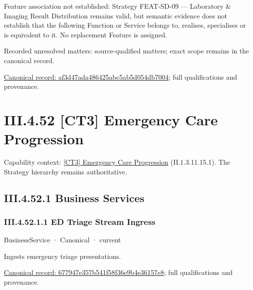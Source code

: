Feature association not established: Strategy FEAT-SD-09 — Laboratory \& Imaging Result Distribution remains valid, but semantic evidence does not establish that the following Function or Service belongs to, realises, specialises or is equivalent to it. No replacement Feature is assigned.


{\small Recorded unresolved matters: source-qualified matters; exact scope remains in the canonical record.}\par
{\footnotesize \href{../../../../continuum/business/business-function/af3d47ada486425abc5ab5d054db7004.md}{Canonical record: af3d47ada486425abc5ab5d054db7004}; full qualifications and provenance.}\par
\section*{III.4.52 [CT3] Emergency Care Progression}
\label{navigation:III.4.52}

{\small Capability context: \hyperref[element:7125e459a48946d0ba075b5ecc3571b4]{[CT3] Emergency Care Progression} (II.1.3.11.15.1). The Strategy hierarchy remains authoritative.}\par
\subsection*{III.4.52.1 Business Services}
\label{navigation:III.4.52.1}

\subsubsection*{III.4.52.1.1 ED Triage Stream Ingress}
\label{navigation:III.4.52.1.1}

\label{element:677947e357b541f58f36e9b4e36157e8}
{\small BusinessService · Canonical · current}\par

Ingests emergency triage presentations.


{\footnotesize \href{../../../../continuum/business/business-service/677947e357b541f58f36e9b4e36157e8.md}{Canonical record: 677947e357b541f58f36e9b4e36157e8}; full qualifications and provenance.}\par
